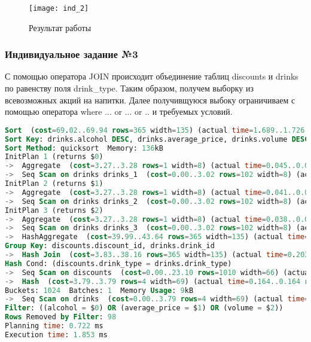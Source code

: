 \begin{figure}[H]
	\begin{center}
		\texttt{[image: ind\_2]}
		\caption{Результат работы} 
		\label{pic:ind_2} %
	\end{center}
\end{figure}

\subsubsection{Индивидуальное задание №3}
С помощью оператора JOIN происходит объединение таблиц discounts и drinks по равенству поля drink\_type.
Таким образом, получем выборку из всевозможных акций на напитки.
Далее получивщуюся выбоку ограничиваем с помощью оператора where ... or ... or .. и требуемых условий.

\newpage


\begin{lstlisting}[language=SQL, caption={План запроса}]
Sort  (cost=69.02..69.94 rows=365 width=135) (actual time=1.689..1.726 rows=420 loops=1)
Sort Key: drinks.alcohol DESC, drinks.average_price, drinks.volume DESC
Sort Method: quicksort  Memory: 136kB
InitPlan 1 (returns $0)
->  Aggregate  (cost=3.27..3.28 rows=1 width=8) (actual time=0.045..0.045 rows=1 loops=1)
->  Seq Scan on drinks drinks_1  (cost=0.00..3.02 rows=102 width=8) (actual time=0.004..0.020 rows=102 loops=1)
InitPlan 2 (returns $1)
->  Aggregate  (cost=3.27..3.28 rows=1 width=8) (actual time=0.041..0.041 rows=1 loops=1)
->  Seq Scan on drinks drinks_2  (cost=0.00..3.02 rows=102 width=8) (actual time=0.004..0.018 rows=102 loops=1)
InitPlan 3 (returns $2)
->  Aggregate  (cost=3.27..3.28 rows=1 width=8) (actual time=0.038..0.038 rows=1 loops=1)
->  Seq Scan on drinks drinks_3  (cost=0.00..3.02 rows=102 width=8) (actual time=0.004..0.017 rows=102 loops=1)
->  HashAggregate  (cost=39.99..43.64 rows=365 width=135) (actual time=1.016..1.239 rows=420 loops=1)
Group Key: discounts.discount_id, drinks.drink_id
->  Hash Join  (cost=3.83..38.16 rows=365 width=135) (actual time=0.203..0.709 rows=420 loops=1)
Hash Cond: (discounts.drink_type = drinks.drink_type)
->  Seq Scan on discounts  (cost=0.00..23.10 rows=1010 width=66) (actual time=0.011..0.172 rows=1009 loops=1)
->  Hash  (cost=3.79..3.79 rows=4 width=69) (actual time=0.164..0.164 rows=4 loops=1)
Buckets: 1024  Batches: 1  Memory Usage: 9kB
->  Seq Scan on drinks  (cost=0.00..3.79 rows=4 width=69) (actual time=0.138..0.161 rows=4 loops=1)
Filter: ((alcohol = $0) OR (average_price = $1) OR (volume = $2))
Rows Removed by Filter: 98
Planning time: 0.722 ms
Execution time: 1.853 ms
\end{lstlisting}

